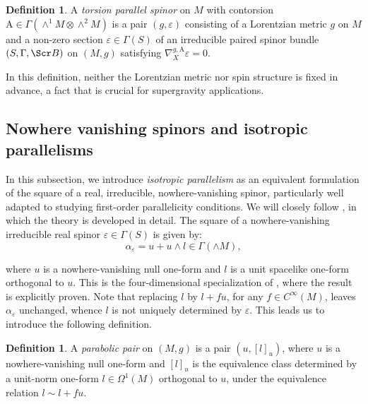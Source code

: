 \documentclass[10pt,reqno,a4paper]{amsart}
\theoremstyle{plain}
\theoremstyle{definition}
\newtheorem{definition}[thm]{Definition}
\theoremstyle{remark}
\theoremstyle{remark}
\def\mA{\mathrm{A}}
\def\cB{\Scr B}
\renewcommand{\(}{ (}
\renewcommand{\)}{ )}
\begin{document}
\begin{definition} 
\label{def:torsionparallel}
A \emph{torsion parallel spinor} on $M$ with contorsion $\mA \in \Gamma(\wedge^1 M \otimes \wedge^2 M)$ is a pair $(g , \varepsilon)$ consisting of a Lorentzian metric $g$ on $M$ and a non-zero section $\varepsilon\in \Gamma(S)$ of an irreducible paired spinor bundle $(S,\Gamma,\cB)$ on $(M,g)$ satisfying $\nabla^{g,\mA}_X\varepsilon = 0$.
\end{definition}

\noindent
In this definition, neither the Lorentzian metric nor spin structure is fixed in advance, a fact that is crucial for supergravity applications.  

%

\subsection{Nowhere vanishing spinors and isotropic parallelisms}

%
 
In this subsection, we introduce \emph{isotropic parallelism} as an equivalent formulation of the square of a real, irreducible, nowhere-vanishing spinor, particularly well adapted to studying first-order parallelicity conditions. We will closely follow \cite{ShahbaziTesis}, in which the theory is developed in detail. The square of a nowhere-vanishing irreducible real spinor $\varepsilon\in\Gamma(S)$ is given by:
\begin{equation*}
\alpha_\varepsilon=u+u\wedge l \in \Gamma(\wedge M),
\end{equation*}

\noindent
where $u$ is a nowhere-vanishing null one-form and $l$ is a unit spacelike one-form orthogonal to $u$.  This is the four-dimensional specialization of \cite[Theorem~3.34]{Cortes:2019xmk}, where the result is explicitly proven.  Note that replacing $l$ by $l+fu$, for any $f\in C^\infty(M)$, leaves $\alpha_\varepsilon$ unchanged, whence $l$ is not uniquely determined by $\varepsilon$. This leads us to introduce the following definition.
  

\begin{definition} 
A \emph{parabolic pair} on $(M,g)$ is a pair $(u,[l]_u)$, where $u$ is a nowhere-vanishing null one-form and $[l]_u$ is the equivalence class determined by a unit-norm one-form $l\in \Omega^1(M)$ orthogonal to $u$, under the equivalence relation $l\sim l+fu$.
\end{definition}
\end{document}
